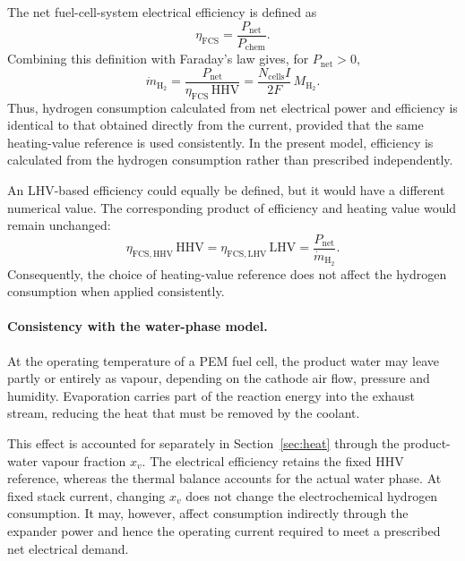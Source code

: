 \documentclass[a4paper,11pt]{article}
\begin{document}
The net fuel-cell-system electrical efficiency is defined as
\begin{equation}
  \eta_\mathrm{FCS} = \frac{P_\mathrm{net}}{P_\mathrm{chem}}.
  \label{eq:etafcs}
\end{equation}
Combining this definition with Faraday's law gives, for
$P_\mathrm{net}>0$,
\begin{equation}
  \dot m_{\mathrm{H_2}}
  = \frac{P_\mathrm{net}}{\eta_\mathrm{FCS}\,\mathrm{HHV}}
  = \frac{N_\mathrm{cells} I}{2F}\,M_{\mathrm{H_2}}.
\end{equation}
Thus, hydrogen consumption calculated from net electrical power and
efficiency is identical to that obtained directly from the current,
provided that the same heating-value reference is used consistently.
In the present model, efficiency is calculated from the hydrogen
consumption rather than prescribed independently.

An LHV-based efficiency could equally be defined, but it would have
a different numerical value. The corresponding product of efficiency
and heating value would remain unchanged:
\begin{equation}
  \eta_\mathrm{FCS,HHV}\,\mathrm{HHV}
  = \eta_\mathrm{FCS,LHV}\,\mathrm{LHV}
  = \frac{P_\mathrm{net}}{\dot m_{\mathrm{H_2}}}.
\end{equation}
Consequently, the choice of heating-value reference does not affect
the hydrogen consumption when applied consistently.

\paragraph{Consistency with the water-phase model.}
At the operating temperature of a PEM fuel cell, the product water
may leave partly or entirely as vapour, depending on the cathode
air flow, pressure and humidity. Evaporation carries part of the
reaction energy into the exhaust stream, reducing the heat that must
be removed by the coolant.

This effect is accounted for separately in Section~\ref{sec:heat}
through the product-water vapour fraction $x_v$. The electrical
efficiency retains the fixed HHV reference, whereas the thermal
balance accounts for the actual water phase. At fixed stack current,
changing $x_v$ does not change the electrochemical hydrogen consumption.
It may, however, affect consumption indirectly through the expander
power and hence the operating current required to meet a prescribed
net electrical demand.
\end{document}
